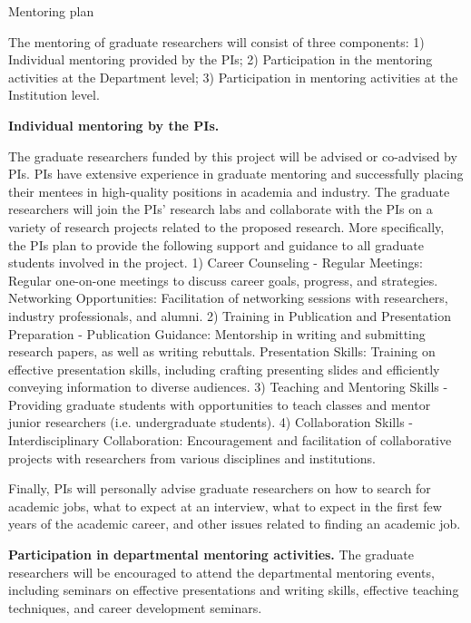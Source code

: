 Mentoring plan

The mentoring of graduate researchers will consist of three components: 
1) Individual mentoring provided by the PIs; 
2) Participation in the mentoring activities at the Department level; 
3) Participation in mentoring activities at the Institution level.

\textbf{Individual mentoring by the PIs.} 

The graduate researchers funded by this project will be advised or co-advised by PIs. 
PIs have extensive experience in graduate mentoring and successfully placing their mentees in high-quality positions in academia and industry. 
The graduate researchers will join the PIs' research labs and collaborate with the PIs on a variety of research projects related to the proposed research. 
More specifically, the PIs plan to provide the following support and guidance to all graduate students involved in the project. 
1) Career Counseling - 
Regular Meetings: Regular one-on-one meetings to discuss career goals, progress, and strategies.
Networking Opportunities: Facilitation of networking sessions with researchers, industry professionals, and alumni. 
2) Training in Publication and Presentation Preparation - 
Publication Guidance: Mentorship in writing and submitting research papers, as well as writing rebuttals.
Presentation Skills: Training on effective presentation skills, including crafting presenting slides and efficiently conveying information to diverse audiences. 
3) Teaching and Mentoring Skills -
Providing graduate students with opportunities to teach classes and mentor junior researchers (i.e. undergraduate students). 
4) Collaboration Skills - 
Interdisciplinary Collaboration: Encouragement and facilitation of collaborative projects with researchers from various disciplines and institutions. 

Finally, PIs will personally advise graduate researchers on how to search for academic jobs, what to expect at an interview, what to expect in the first few years of the academic career, and other issues related to finding an academic job.

\textbf{Participation in departmental mentoring activities.} 
The graduate researchers will be encouraged to attend the departmental mentoring events, including seminars on effective presentations and writing skills, effective teaching techniques, and career development seminars.


